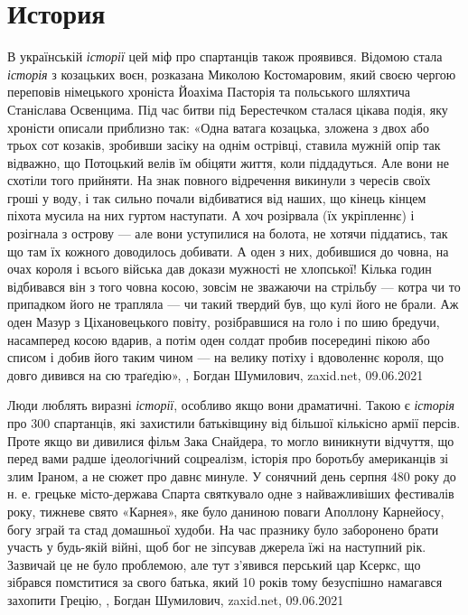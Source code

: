  
 
 
 
 
\chapter{История}
\label{sec:slova.istoria}

В українській \emph{історії} цей міф про спартанців також проявився. Відомою
стала \emph{історія} з козацьких воєн, розказана Миколою Костомаровим, який
своєю чергою переповів німецького хроніста Йоахіма Пасторія та польського
шляхтича Станіслава Освенцима. Під час битви під Берестечком сталася цікава
подія, яку хроністи описали приблизно так: «Одна ватага козацька, зложена з
двох або трьох сот козаків, зробивши засіку на однім острівці, ставила мужній
опір так відважно, що Потоцький велів їм обіцяти життя, коли піддадуться. Але
вони не схотіли того прийняти. На знак повного відречення викинули з чересів
своїх гроші у воду, і так сильно почали відбиватися від наших, що кінець кінцем
піхота мусила на них гуртом наступати. А хоч розірвала (їх укріпленнє) і
розігнала з острову — але вони уступилися на болота, не хотячи піддатись, так
що там їх кожного доводилось добивати. А оден з них, добившися до човна, на
очах короля і всього війська дав докази мужності не хлопської! Кілька годин
відбивався він з того човна косою, зовсім не зважаючи на стрільбу — котра чи то
припадком його не трапляла — чи такий твердий був, що кулі його не брали. Аж
оден Мазур з Ціхановецького повіту, розібравшися на голо і по шию бредучи,
насамперед косою вдарив, а потім оден солдат пробив посередині пікою або списом
і добив його таким чином — на велику потіху і вдоволеннє короля, що довго
дивився на сю траґедію»,
, Богдан Шумилович, zaxid.net, 09.06.2021

Люди люблять виразні \emph{історії}, особливо якщо вони драматичні. Такою є \emph{історія}
про 300 спартанців, які захистили батьківщину від більшої кількісно армії
персів. Проте якщо ви дивилися фільм Зака Снайдера, то могло виникнути
відчуття, що перед вами радше ідеологічний соцреалізм, історія про боротьбу
американців зі злим Іраном, а не сюжет про давнє минуле.  У сонячний день
серпня 480 року до н. е. грецьке місто-держава Спарта святкувало одне з
найважливіших фестивалів року, тижневе свято «Карнея», яке було даниною поваги
Аполлону Карнейосу, богу зграй та стад домашньої худоби. На час празнику було
заборонено брати участь у будь-якій війні, щоб бог не зіпсував джерела їжі на
наступний рік. Зазвичай це не було проблемою, але тут з'явився перський цар
Ксеркс, що зібрався помститися за свого батька, який 10 років тому безуспішно
намагався захопити Грецію,
, Богдан Шумилович, zaxid.net, 09.06.2021

